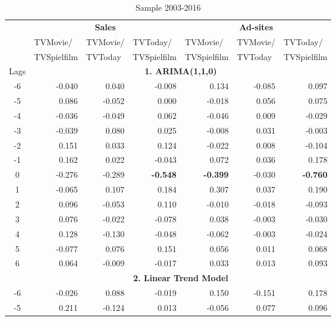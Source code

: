 \documentclass[10pt,a4paper]{scrreprt}
\begin{document}
\begin{table}[htbp]
  \centering
  \caption{Sample 2003-2016}
    \begin{tabular}{c|rrr|rrr|}
	 & \multicolumn{3}{c|}{\textbf{Sales}} & \multicolumn{3}{c|}{\textbf{Ad-sites}} \\
          & \multicolumn{1}{l}{TVMovie/} & \multicolumn{1}{l}{TVMovie/} & \multicolumn{1}{l|}{TVToday/} & \multicolumn{1}{l}{TVMovie/} & \multicolumn{1}{l}{TVMovie/} & \multicolumn{1}{l|}{TVToday/} \\
          & \multicolumn{1}{l}{TVSpielfilm} & \multicolumn{1}{l}{TVToday} & \multicolumn{1}{l|}{TVSpielfilm} & \multicolumn{1}{l}{TVSpielfilm} & \multicolumn{1}{l}{TVToday} & \multicolumn{1}{l|}{TVSpielfilm} \\
   \multicolumn{1}{c}{Lags} & \multicolumn{6}{c}{\textbf{1. ARIMA(1,1,0)}} \\
    -6    & -0.040 & 0.040 & -0.008 & 0.134 & -0.085 & 0.097 \\
    -5    & 0.086 & -0.052 & 0.000 & -0.018 & 0.056 & 0.075 \\
    -4    & -0.036 & -0.049 & 0.062 & -0.046 & 0.009 & -0.029 \\
    -3    & -0.039 & 0.080 & 0.025 & -0.008 & 0.031 & -0.003 \\
    -2    & 0.151 & 0.033 & 0.124 & -0.022 & 0.008 & -0.104 \\
    -1    & 0.162 & 0.022 & -0.043 & 0.072 & 0.036 & 0.178 \\
    0     & -0.276 & -0.289 & \textbf{-0.548} & \textbf{-0.399} & -0.030 & \textbf{-0.760} \\
    1     & -0.065 & 0.107 & 0.184 & 0.307 & 0.037 & 0.190 \\
    2     & 0.096 & -0.053 & 0.110 & -0.010 & -0.018 & -0.093 \\
    3     & 0.076 & -0.022 & -0.078 & 0.038 & -0.003 & -0.030 \\
    4     & 0.128 & -0.130 & -0.048 & -0.062 & -0.003 & -0.024 \\
    5     & -0.077 & 0.076 & 0.151 & 0.056 & 0.011 & 0.068 \\
    6     & 0.064 & -0.009 & -0.017 & 0.033 & 0.013 & 0.093 \\
    \multicolumn{1}{r}{} & \multicolumn{6}{c}{\textbf{2. Linear Trend Model}} \\
    -6    & -0.026 & 0.088 & -0.019 & 0.150 & -0.151 & 0.178 \\
    -5    & 0.211 & -0.124 & 0.013 & -0.056 & 0.077 & 0.096 \\

\end{tabular}
\end{table}
\end{document}
